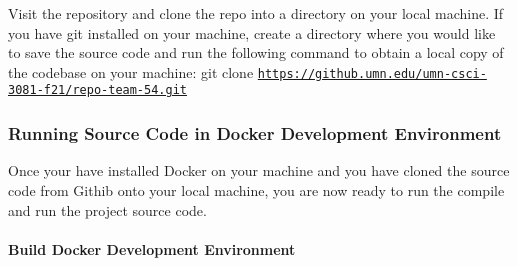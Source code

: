 Visit the repository and {\ttfamily clone} the repo into a directory on your local machine. If you have git installed on your machine, create a directory where you would like to save the source code and run the following command to obtain a local copy of the codebase on your machine\+: {\ttfamily git clone \href{https://github.umn.edu/umn-csci-3081-f21/repo-team-54.git}{\tt https\+://github.\+umn.\+edu/umn-\/csci-\/3081-\/f21/repo-\/team-\/54.\+git}}

\subsubsection*{Running Source Code in Docker Development Environment}

Once your have installed Docker on your machine and you have cloned the source code from Githib onto your local machine, you are now ready to run the compile and run the project source code.

\paragraph*{Build Docker Development Environment}

